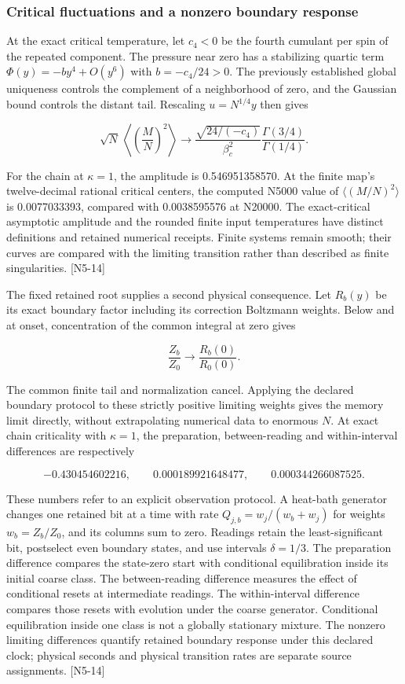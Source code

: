 \subsubsection{Critical fluctuations and a nonzero boundary response}\label{critical-fluctuations-and-a-nonzero-boundary-response}

At the exact critical temperature, let \(c_4<0\) be the fourth cumulant per spin of the repeated component. The pressure near zero has a stabilizing quartic term \(\Phi(y)=-by^4+O(y^6)\) with \(b=-c_4/24>0\). The previously established global uniqueness controls the complement of a neighborhood of zero, and the Gaussian bound controls the distant tail. Rescaling \(u=N^{1/4}y\) then gives

\[\sqrt N\,\left\langle\left(\frac MN\right)^2\right\rangle
\longrightarrow
\frac{\sqrt{24/(-c_4)}}{\beta_c^2}
\frac{\Gamma(3/4)}{\Gamma(1/4)}.\]

For the chain at \(\kappa=1\), the amplitude is 0.546951358570. At the finite map's twelve-decimal rational critical centers, the computed N5000 value of \(\langle(M/N)^2\rangle\) is 0.0077033393, compared with 0.0038595576 at N20000. The exact-critical asymptotic amplitude and the rounded finite input temperatures have distinct definitions and retained numerical receipts. Finite systems remain smooth; their curves are compared with the limiting transition rather than described as finite singularities. {[}N5-14{]}

The fixed retained root supplies a second physical consequence. Let \(R_b(y)\) be its exact boundary factor including its correction Boltzmann weights. Below and at onset, concentration of the common integral at zero gives

\[\frac{Z_b}{Z_0}\longrightarrow\frac{R_b(0)}{R_0(0)}.\]

The common finite tail and normalization cancel. Applying the declared boundary protocol to these strictly positive limiting weights gives the memory limit directly, without extrapolating numerical data to enormous \(N\). At exact chain criticality with \(\kappa=1\), the preparation, between-reading and within-interval differences are respectively

\[-0.430454602216,\qquad
0.000189921648477,\qquad
0.000344266087525.\]

These numbers refer to an explicit observation protocol. A heat-bath generator changes one retained bit at a time with rate \(Q_{j,b}=w_j/(w_b+w_j)\) for weights \(w_b=Z_b/Z_0\), and its columns sum to zero. Readings retain the least-significant bit, postselect even boundary states, and use intervals \(\delta=1/3\). The preparation difference compares the state-zero start with conditional equilibration inside its initial coarse class. The between-reading difference measures the effect of conditional resets at intermediate readings. The within-interval difference compares those resets with evolution under the coarse generator. Conditional equilibration inside one class is not a globally stationary mixture. The nonzero limiting differences quantify retained boundary response under this declared clock; physical seconds and physical transition rates are separate source assignments. {[}N5-14{]}


